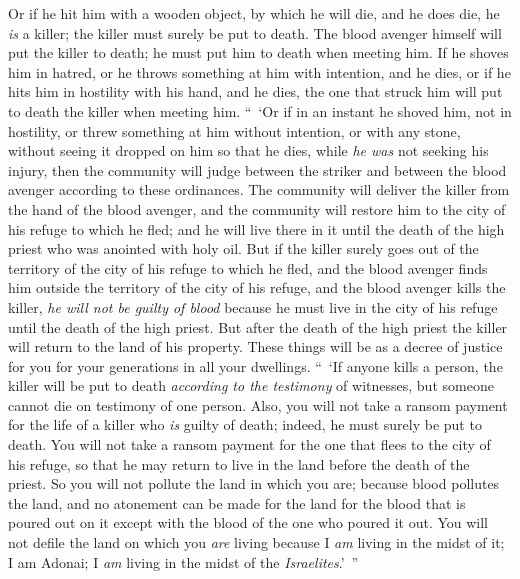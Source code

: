 \begin{biblechapter}
\verse Or if he hit him with a wooden object, by which he will die, and he does die, he \textit{is} a killer; the killer must surely be put to death.
\verse The blood avenger himself will put the killer to death; he must put him to death when meeting him.
\verse If he shoves him in hatred, or he throws something at him with intention, and he dies,
\verse or if he hits him in hostility with his hand, and he dies, the one that struck him will put to death the killer when meeting him.
\verse “ ‘Or if in an instant he shoved him, not in hostility, or threw something at him without intention,
\verse or with any stone, without seeing it dropped on him so that he dies, while \textit{he was} not seeking his injury,
\verse then the community will judge between the striker and between the blood avenger according to these ordinances.
\verse The community will deliver the killer from the hand of the blood avenger, and the community will restore him to the city of his refuge to which he fled; and he will live there in it until the death of the high priest who was anointed with holy oil.
\verse But if the killer surely goes out of the territory of the city of his refuge to which he fled,
\verse and the blood avenger finds him outside the territory of the city of his refuge, and the blood avenger kills the killer, \textit{he will not be guilty of blood}
\verse because he must live in the city of his refuge until the death of the high priest. But after the death of the high priest the killer will return to the land of his property.
\verse These things will be as a decree of justice for you for your generations in all your dwellings.
\verse “ ‘If anyone kills a person, the killer will be put to death \textit{according to the testimony} of witnesses, but someone cannot die on testimony of one person.
\verse Also, you will not take a ransom payment for the life of a killer who \textit{is} guilty of death; indeed, he must surely be put to death.
\verse You will not take a ransom payment for the one that flees to the city of his refuge, so that he may return to live in the land before the death of the priest.
\verse So you will not pollute the land in which you are; because blood pollutes the land, and no atonement can be made for the land for the blood that is poured out on it except with the blood of the one who poured it out.
\verse You will not defile the land on which you \textit{are} living because I \textit{am} living in the midst of it; I am Adonai; I \textit{am} living in the midst of the \textit{Israelites}.’ ”
\end{biblechapter}


